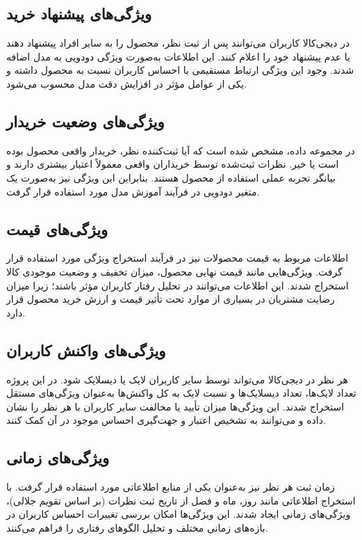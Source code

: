  \subsection{ویژگی‌های پیشنهاد خرید }
 در دیجی‌کالا کاربران می‌توانند پس از ثبت نظر، محصول را به سایر افراد پیشنهاد دهند یا عدم پیشنهاد خود را اعلام کنند. این اطلاعات به‌صورت ویژگی دودویی  به مدل اضافه شدند. وجود این ویژگی ارتباط مستقیمی با احساس کاربران نسبت به محصول داشته و یکی از عوامل مؤثر در افزایش دقت مدل محسوب می‌شود.
 \subsection{ویژگی‌های وضعیت خریدار }
 در مجموعه داده، مشخص شده است که آیا ثبت‌کننده نظر، خریدار واقعی محصول بوده است یا خیر. نظرات ثبت‌شده توسط خریداران واقعی معمولاً اعتبار بیشتری دارند و بیانگر تجربه عملی استفاده از محصول هستند. بنابراین این ویژگی نیز به‌صورت یک متغیر دودویی در فرآیند آموزش مدل مورد استفاده قرار گرفت.
 \subsection{ویژگی‌های قیمت }
اطلاعات مربوط به قیمت محصولات نیز در فرآیند استخراج ویژگی مورد استفاده قرار گرفت. ویژگی‌هایی مانند قیمت نهایی محصول، میزان تخفیف و وضعیت موجودی کالا استخراج شدند. این اطلاعات می‌توانند در تحلیل رفتار کاربران مؤثر باشند؛ زیرا میزان رضایت مشتریان در بسیاری از موارد تحت تأثیر قیمت و ارزش خرید محصول قرار دارد.
\subsection{ویژگی‌های واکنش کاربران }
هر نظر در دیجی‌کالا می‌تواند توسط سایر کاربران لایک یا دیسلایک شود. در این پروژه تعداد لایک‌ها، تعداد دیسلایک‌ها و نسبت لایک به کل واکنش‌ها به‌عنوان ویژگی‌های مستقل استخراج شدند. این ویژگی‌ها میزان تأیید یا مخالفت سایر کاربران با هر نظر را نشان داده و می‌توانند به تشخیص اعتبار و جهت‌گیری احساس موجود در آن کمک کنند.
\subsection{ویژگی‌های زمانی }
زمان ثبت هر نظر نیز به‌عنوان یکی از منابع اطلاعاتی مورد استفاده قرار گرفت. با استخراج اطلاعاتی مانند روز، ماه و فصل از تاریخ ثبت نظرات (بر اساس تقویم جلالی)، ویژگی‌های زمانی ایجاد شدند. این ویژگی‌ها امکان بررسی تغییرات احساس کاربران در بازه‌های زمانی مختلف و تحلیل الگوهای رفتاری را فراهم می‌کنند.


